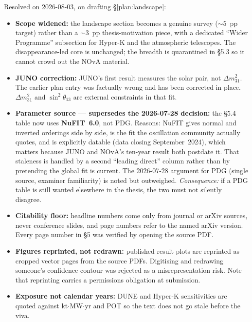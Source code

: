 \documentclass[11pt]{article}
\begin{document}
Resolved on 2026-08-03, on drafting \S\ref{plan:landscape}:
\begin{itemize}
    \item[$\checkmark$] \textbf{Scope widened:} the landscape section becomes a genuine
    survey ($\sim 5$~pp target) rather than a $\sim 3$~pp thesis-motivation piece, with a
    dedicated ``Wider Programme'' subsection for Hyper-K and the atmospheric telescopes.
    The disappearance-led core is unchanged; the breadth is quarantined in \S5.3 so it
    cannot crowd out the NOvA material.
    \item[$\checkmark$] \textbf{JUNO correction:} JUNO's first result measures the solar
    pair, not $\Delta m^{2}_{31}$. The earlier plan entry was factually wrong and has been
    corrected in place. $\Delta m^{2}_{31}$ and $\sin^{2}\theta_{13}$ are external
    constraints in that fit.
    \item[$\checkmark$] \textbf{Parameter source --- supersedes the 2026-07-28 decision:}
    the \S5.4 table now uses \textbf{NuFIT~6.0}, not PDG. Reasons: NuFIT gives normal and
    inverted orderings side by side, is the fit the oscillation community actually quotes,
    and is explicitly datable (data closing September~2024), which matters because JUNO and
    NOvA's ten-year result both postdate it. That staleness is handled by a second
    ``leading direct'' column rather than by pretending the global fit is current. The
    2026-07-28 argument for PDG (single source, examiner familiarity) is noted but
    outweighed. \emph{Consequence:} if a PDG table is still wanted elsewhere in the thesis,
    the two must not silently disagree.
    \item[$\checkmark$] \textbf{Citability floor:} headline numbers come only from journal
    or arXiv sources, never conference slides, and page numbers refer to the named arXiv
    version. Every page number in \S5 was verified by opening the source PDF.
    \item[$\checkmark$] \textbf{Figures reprinted, not redrawn:} published result plots are
    reprinted as cropped vector pages from the source PDFs. Digitising and redrawing
    someone's confidence contour was rejected as a misrepresentation risk. Note that
    reprinting carries a permissions obligation at submission.
    \item[$\checkmark$] \textbf{Exposure not calendar years:} DUNE and Hyper-K sensitivities
    are quoted against kt$\cdot$MW$\cdot$yr and POT so the text does not go stale before the
    viva.
\end{itemize}
\end{document}

